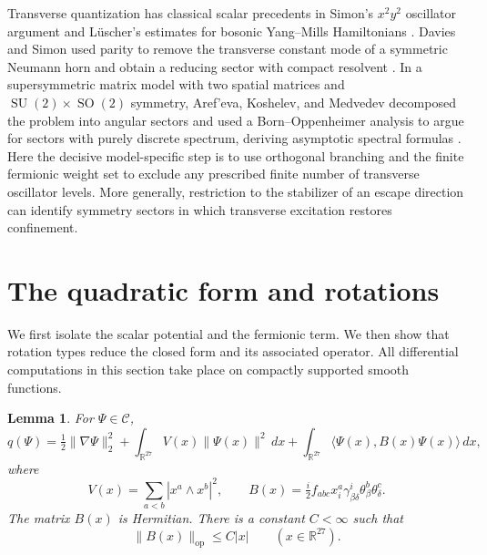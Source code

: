 \documentclass[11pt]{amsart}
\newcommand{\R}{\mathbb R}
\newcommand{\Core}{\mathcal C}
\newcommand{\SU}{\operatorname{SU}}
\newcommand{\SO}{\operatorname{SO}}
\newcommand{\norm}[1]{\lVert #1\rVert}
\newcommand{\ip}[2]{\langle #1,#2\rangle}
\newtheorem{lemma}[theorem]{Lemma}
\theoremstyle{remark}
\numberwithin{equation}{section}
\begin{document}
Transverse quantization has classical scalar precedents in Simon's
$x^2y^2$ oscillator argument \cite[Section~2]{Simon} and L\"uscher's
estimates for bosonic Yang--Mills Hamiltonians
\cite[Appendix~D]{Luscher}. Davies and Simon used parity to remove the
transverse constant mode of a symmetric Neumann horn and obtain a reducing sector
with compact resolvent \cite[Theorem~3.1 and Step~7]{DaviesSimon}.
In a supersymmetric matrix model with two spatial matrices and
$\SU(2)\times\SO(2)$ symmetry, Aref'eva, Koshelev, and Medvedev
decomposed the problem into angular sectors and used a
Born--Oppenheimer analysis to argue for sectors with purely discrete
spectrum, deriving asymptotic spectral formulas
\cite[Sections~5--6]{ArefevaKoshelevMedvedev}.
Here the decisive model-specific step is to use orthogonal branching
and the finite fermionic weight set to exclude any prescribed finite
number of transverse oscillator levels. More generally, restriction
to the stabilizer of an escape direction can identify symmetry sectors
in which transverse excitation restores confinement.

\section{The quadratic form and rotations}
\label{sec:form}

We first isolate the scalar potential and the fermionic term. We then
show that rotation types reduce the closed form and its associated
operator. All differential computations in this section take place on
compactly supported smooth functions.

\begin{lemma}
\label{lem:form}
For $\Psi\in\Core$,
\begin{equation}
 q(\Psi)=\tfrac12\norm{\nabla\Psi}_2^2
   +\int_{\R^{27}}V(x)\norm{\Psi(x)}^2\,dx
   +\int_{\R^{27}}\ip{\Psi(x)}{B(x)\Psi(x)}\,dx,
 \label{eq:form}
\end{equation}
where
\begin{equation}
 V(x)=\sum_{a<b}|x^a\wedge x^b|^2,\qquad
 B(x)=\tfrac i2 f_{abc}x_i^a\gamma^i_{\beta\delta}
                   \theta_\beta^b\theta_\delta^c.
 \label{eq:potential}
\end{equation}
The matrix $B(x)$ is Hermitian. There is a constant $C<\infty$ such that
\begin{equation}
 \norm{B(x)}_{\mathrm{op}}\leq C|x|\qquad(x\in\R^{27}).
 \label{eq:fermion-bound}
\end{equation}
\end{lemma}
\end{document}
